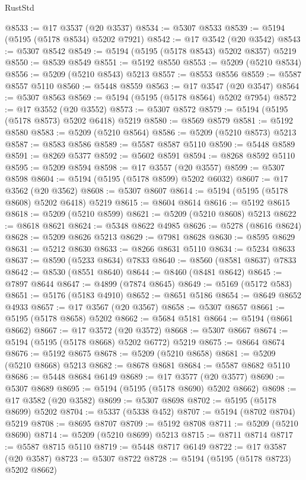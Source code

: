 \begin{lexlean}{RustStd}
\begin{coremodule}
@8533 := @17 @3537 (@20 @3537)
@8534 := @5307 @8533
@8539 := @5194 (@5195 (@5178 @8534) @5202 @7921)
@8542 := @17 @3542 (@20 @3542)
@8543 := @5307 @8542
@8549 := @5194 (@5195 (@5178 @8543) @5202 @8357) @5219
@8550 := @8539 @8549
@8551 := @5192 @8550
@8553 := @5209 (@5210 @8534)
@8556 := @5209 (@5210 @8543) @5213
@8557 := @8553 @8556
@8559 := @5587 @8557 @5110
@8560 := @5448 @8559
@8563 := @17 @3547 (@20 @3547)
@8564 := @5307 @8563
@8569 := @5194 (@5195 (@5178 @8564) @5202 @7954)
@8572 := @17 @3552 (@20 @3552)
@8573 := @5307 @8572
@8579 := @5194 (@5195 (@5178 @8573) @5202 @6418) @5219
@8580 := @8569 @8579
@8581 := @5192 @8580
@8583 := @5209 (@5210 @8564)
@8586 := @5209 (@5210 @8573) @5213
@8587 := @8583 @8586
@8589 := @5587 @8587 @5110
@8590 := @5448 @8589
@8591 := @8269 @5377
@8592 := @5602 @8591
@8594 := @8268 @8592 @5110
@8595 := @5209 @8594
@8598 := @17 @3557 (@20 @3557)
@8599 := @5307 @8598
@8604 := @5194 (@5195 (@5178 @8599) @5202 @6032)
@8607 := @17 @3562 (@20 @3562)
@8608 := @5307 @8607
@8614 := @5194 (@5195 (@5178 @8608) @5202 @6418) @5219
@8615 := @8604 @8614
@8616 := @5192 @8615
@8618 := @5209 (@5210 @8599)
@8621 := @5209 (@5210 @8608) @5213
@8622 := @8618 @8621
@8624 := @5348 @8622 @4985
@8626 := @5278 (@8616 @8624)
@8628 := @5209 @8626 @5213
@8629 := @7981 @8628
@8630 := @8595 @8629
@8631 := @5212 @8630
@8633 := @8266 @8631 @5110
@8634 := @5234 @8633
@8637 := @8590 (@5233 @8634) @7833
@8640 := @8560 (@8581 @8637) @7833
@8642 := @8530 (@8551 @8640)
@8644 := @8460 (@8481 @8642)
@8645 := @7897 @8644
@8647 := @4899 (@7874 @8645)
@8649 := @5169 (@5172 @583)
@8651 := @5176 (@5183 @4910)
@8652 := @8651 @5186
@8654 := @8649 @8652 @4933
@8657 := @17 @3567 (@20 @3567)
@8658 := @5307 @8657
@8661 := @5195 (@5178 @8658) @5202
@8662 := @5684 @5181
@8664 := @5194 (@8661 @8662)
@8667 := @17 @3572 (@20 @3572)
@8668 := @5307 @8667
@8674 := @5194 (@5195 (@5178 @8668) @5202 @6772) @5219
@8675 := @8664 @8674
@8676 := @5192 @8675
@8678 := @5209 (@5210 @8658)
@8681 := @5209 (@5210 @8668) @5213
@8682 := @8678 @8681
@8684 := @5587 @8682 @5110
@8686 := @5448 @8684 @6149
@8689 := @17 @3577 (@20 @3577)
@8690 := @5307 @8689
@8695 := @5194 (@5195 (@5178 @8690) @5202 @8662)
@8698 := @17 @3582 (@20 @3582)
@8699 := @5307 @8698
@8702 := @5195 (@5178 @8699) @5202
@8704 := @5337 (@5338 @452)
@8707 := @5194 (@8702 @8704) @5219
@8708 := @8695 @8707
@8709 := @5192 @8708
@8711 := @5209 (@5210 @8690)
@8714 := @5209 (@5210 @8699) @5213
@8715 := @8711 @8714
@8717 := @5587 @8715 @5110
@8719 := @5448 @8717 @6149
@8722 := @17 @3587 (@20 @3587)
@8723 := @5307 @8722
@8728 := @5194 (@5195 (@5178 @8723) @5202 @8662)

\end{coremodule}
\end{lexlean}
